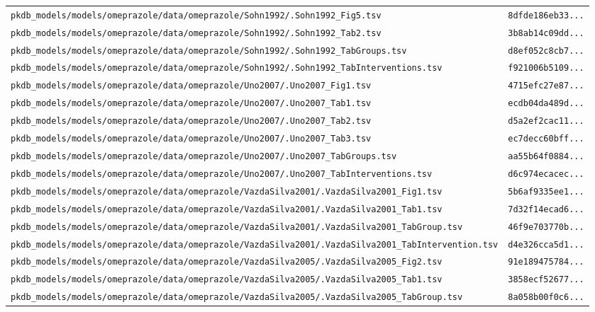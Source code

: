\documentclass{article}
\begin{document}
\begin{longtable}{ll}
\texttt{pkdb\_models/models/omeprazole/data/omeprazole/Sohn1992/.Sohn1992\_Fig5.tsv} & \texttt{8dfde186eb33...} \\
\texttt{pkdb\_models/models/omeprazole/data/omeprazole/Sohn1992/.Sohn1992\_Tab2.tsv} & \texttt{3b8ab14c09dd...} \\
\texttt{pkdb\_models/models/omeprazole/data/omeprazole/Sohn1992/.Sohn1992\_TabGroups.tsv} & \texttt{d8ef052c8cb7...} \\
\texttt{pkdb\_models/models/omeprazole/data/omeprazole/Sohn1992/.Sohn1992\_TabInterventions.tsv} & \texttt{f921006b5109...} \\
\texttt{pkdb\_models/models/omeprazole/data/omeprazole/Uno2007/.Uno2007\_Fig1.tsv} & \texttt{4715efc27e87...} \\
\texttt{pkdb\_models/models/omeprazole/data/omeprazole/Uno2007/.Uno2007\_Tab1.tsv} & \texttt{ecdb04da489d...} \\
\texttt{pkdb\_models/models/omeprazole/data/omeprazole/Uno2007/.Uno2007\_Tab2.tsv} & \texttt{d5a2ef2cac11...} \\
\texttt{pkdb\_models/models/omeprazole/data/omeprazole/Uno2007/.Uno2007\_Tab3.tsv} & \texttt{ec7decc60bff...} \\
\texttt{pkdb\_models/models/omeprazole/data/omeprazole/Uno2007/.Uno2007\_TabGroups.tsv} & \texttt{aa55b64f0884...} \\
\texttt{pkdb\_models/models/omeprazole/data/omeprazole/Uno2007/.Uno2007\_TabInterventions.tsv} & \texttt{d6c974ecacec...} \\
\texttt{pkdb\_models/models/omeprazole/data/omeprazole/VazdaSilva2001/.VazdaSilva2001\_Fig1.tsv} & \texttt{5b6af9335ee1...} \\
\texttt{pkdb\_models/models/omeprazole/data/omeprazole/VazdaSilva2001/.VazdaSilva2001\_Tab1.tsv} & \texttt{7d32f14ecad6...} \\
\texttt{pkdb\_models/models/omeprazole/data/omeprazole/VazdaSilva2001/.VazdaSilva2001\_TabGroup.tsv} & \texttt{46f9e703770b...} \\
\texttt{pkdb\_models/models/omeprazole/data/omeprazole/VazdaSilva2001/.VazdaSilva2001\_TabIntervention.tsv} & \texttt{d4e326cca5d1...} \\
\texttt{pkdb\_models/models/omeprazole/data/omeprazole/VazdaSilva2005/.VazdaSilva2005\_Fig2.tsv} & \texttt{91e189475784...} \\
\texttt{pkdb\_models/models/omeprazole/data/omeprazole/VazdaSilva2005/.VazdaSilva2005\_Tab1.tsv} & \texttt{3858ecf52677...} \\
\texttt{pkdb\_models/models/omeprazole/data/omeprazole/VazdaSilva2005/.VazdaSilva2005\_TabGroup.tsv} & \texttt{8a058b00f0c6...} \\

\end{longtable}
\end{document}
